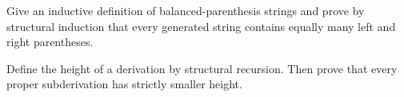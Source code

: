 \begin{exercise}
\label{ex:strings-01}
Give an inductive definition of balanced-parenthesis strings and prove by
structural induction that every generated string contains equally many left
and right parentheses.
\end{exercise}

\begin{exercise}
\label{ex:strings-02}
Define the height of a derivation by structural recursion.  Then prove that
every proper subderivation has strictly smaller height.
\end{exercise}

